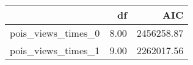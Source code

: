 \begin{table}[ht]
\centering
\begin{tabular}{rrr}
  \hline
 & df & AIC \\ 
  \hline
pois\_views\_times\_0 & 8.00 & 2456258.87 \\ 
  pois\_views\_times\_1 & 9.00 & 2262017.56 \\ 
   \hline
\end{tabular}
\end{table}
